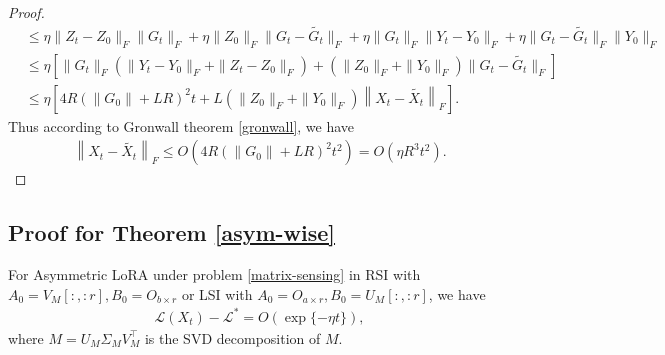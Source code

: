 \begin{proof}
\begin{align}
        &\leq \eta \|Z_t-Z_0\|_F\|G_t\|_F +\eta\|Z_0\|_F\|G_t-\tilde{G_t}\|_F+\eta \|G_t\|_F\|Y_t-Y_0\|_F+\eta \|G_t-\tilde{G_t}\|_F\|Y_0\|_F\\
        &\leq \eta\left[\|G_t\|_F(\|Y_t-Y_0\|_F+\|Z_t-Z_0\|_F) + (\|Z_0\|_F+\|Y_0\|_F)\|G_t-\tilde{G_t}\|_F\right]\\
        &\leq \eta\left[4R(\|G_0\|+LR)^2t + L(\|Z_0\|_F+\|Y_0\|_F)\left\|X_t-\tilde{X_t}\right\|_F\right].
    \end{align}
    Thus according to Gronwall theorem \ref{gronwall}, we have
    \begin{align}
        \left\|X_t-\tilde{X_t}\right\|_F\leq O(4R(\|G_0\|+LR)^2t^2)= O(\eta R^3t^2).
    \end{align}
\end{proof}


\subsection{Proof for Theorem \ref{asym-wise}}
\label{asym-wise-proof}
\begin{theorem}
    For Asymmetric LoRA under problem \ref{matrix-sensing} in RSI with $A_0=V_M[:,:r],B_0=O_{b\times r}$ or LSI with $A_0=O_{a\times r},B_0=U_M[:,:r]$, we have
    \begin{align*}
        \mathcal{L}(X_t)-\mathcal{L}^*=O(\exp\{-\eta t\}),
    \end{align*}
    where $M=U_M\Sigma_MV_M^\top$ is the SVD decomposition of $M$. 
\end{theorem}
